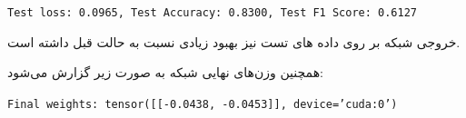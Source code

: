 \begin{enumerate}
\begin{qsolve}
		\begin{latin}
			\texttt{Test loss: 0.0965, Test Accuracy: 0.8300, Test F1 Score: 0.6127}\\
		\end{latin}
		
		خروجی شبکه بر روی داده های تست نیز بهبود زیادی نسبت به حالت قبل داشته است.
		
		همچنین وزن‌های نهایی شبکه به صورت زیر گزارش می‌شود:
		\begin{latin}
			\texttt{Final weights: tensor([[-0.0438, -0.0453]], device='cuda:0')}\\
		\end{latin}
	\end{qsolve}
	
	
	
	
\end{enumerate}








































